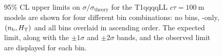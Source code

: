 \begin{figure}[!h]
    \centering
     ~~
    \caption{
        95\% CL upper limits on $\sigma/\sigma_{\mathrm{theory}}$ for the
        T1qqqqLL $c\tau=100~\mathrm{m}$ models are shown for four different
        bin combinations: no bins, \scalht-only, $(n_{\text{b}},\mbox{$H_\text{T}$})$ and all bins
        overlaid in ascending order. The expected limit, along with the
        $\pm 1\sigma$ and $\pm 2\sigma$ bands, and the observed limit are
        displayed for each bin.
    }
    \label{fig:T1qqqqLL_ctau_100000_limitsPerBin}
\end{figure}

